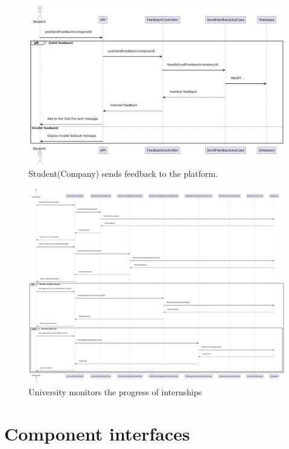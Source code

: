 \newpage

\begin{figure}[ht!]
    \centering
    \includegraphics[scale=0.4]{Images/ImagesSequenceDiagram/SendFeebackSD.png}
    \caption{Student(Company) sends feedback to the platform.}
\end{figure}


\newpage

\begin{figure}[ht!]
    \centering
    \includegraphics[scale=0.21]{Images/ImagesSequenceDiagram/UniversityMonitorsInternship.png}
    \caption{University monitors the progress of internships}
\end{figure}

\newpage

\section{Component interfaces}

